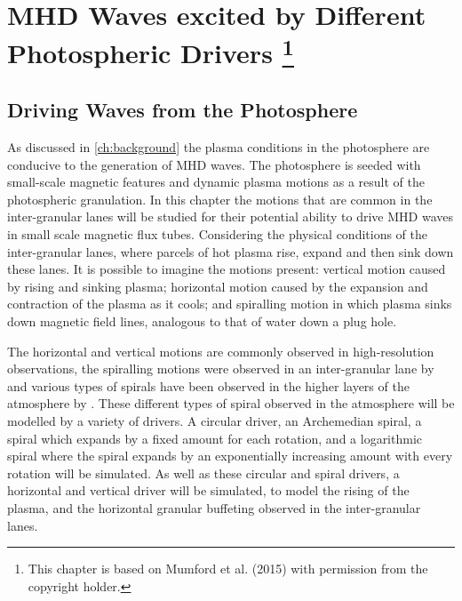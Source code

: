\documentclass[a4paper,12pt,fourier,authoryear,custommargin]{Classes/PhDThesisPSnPDF}
\begin{document}
\chapter[MHD Waves excited by Different Photospheric Drivers]{MHD Waves excited by Different Photospheric Drivers \footnote{This chapter is based on Mumford et al. (2015) with permission from the copyright holder.}}\label{ch:drivers}


\section{Driving Waves from the Photosphere}\label{sec:5drivers}

As discussed in \cref{ch:background} the plasma conditions in the photosphere are conducive to the generation of MHD waves.
The photosphere is seeded with small-scale magnetic features and dynamic plasma motions as a result of the photospheric granulation.
In this chapter the motions that are common in the inter-granular lanes will be studied for their potential ability to drive MHD waves in small scale magnetic flux tubes.
Considering the physical conditions of the inter-granular lanes, where parcels of hot plasma rise, expand and then sink down these lanes.
It is possible to imagine the motions present: vertical motion caused by rising and sinking plasma; horizontal motion caused by the expansion and contraction of the plasma as it cools; and spiralling motion in which plasma sinks down magnetic field lines, analogous to that of water down a plug hole.

The horizontal and vertical motions are commonly observed in high-resolution observations, the spiralling motions were observed in an inter-granular lane by \cite{bonet2008, bonet2010} and various types of spirals have been observed in the higher layers of the atmosphere by \cite{wedemeyer-bohm2009,wedemeyer-bohm2012,wedemeyer2013}.
These different types of spiral observed in the atmosphere will be modelled by a variety of drivers.
A circular driver, an Archemedian spiral, a spiral which expands by a fixed amount for each rotation, and a logarithmic spiral where the spiral expands by an exponentially increasing amount with every rotation will be simulated.
As well as these circular and spiral drivers, a horizontal and vertical driver will be simulated, to model the rising of the plasma, and the horizontal granular buffeting observed in the inter-granular lanes.
\end{document}
